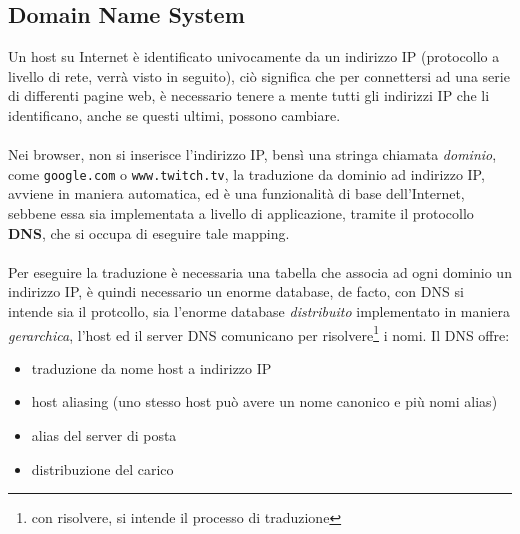 \documentclass[12pt, letterpaper]{article}
\newcommand{\code}[1]{\colorbox{light-gray}{\texttt{#1}}}
\newcommand{\acc}{\\\hphantom{}\\}
\begin{document}
\subsection{Domain Name System}
Un host su Internet è identificato univocamente da un indirizzo IP (protocollo a livello di rete, verrà
visto in seguito), ciò significa che per connettersi ad una serie di differenti pagine web, è necessario
tenere a mente tutti gli indirizzi IP che li identificano, anche se questi ultimi, possono cambiare.\acc
Nei browser, non si inserisce l'indirizzo IP, bensì una stringa chiamata \textit{dominio}, come
\code{google.com} o \code{www.twitch.tv}, la traduzione da dominio ad indirizzo IP, avviene in maniera automatica,
ed è una funzionalità di base dell'Internet, sebbene essa sia implementata a livello di applicazione, tramite il
protocollo \textbf{DNS}, che si occupa di eseguire tale mapping.\acc
Per eseguire la traduzione è necessaria una tabella che associa ad ogni dominio un indirizzo IP, è quindi
necessario un enorme database, de facto, con DNS si intende sia il protcollo, sia l'enorme
database \textit{distribuito} implementato in maniera \textit{gerarchica}, l'host ed il server DNS comunicano
per risolvere\footnote{con risolvere, si intende il processo di traduzione} i nomi. Il DNS offre:\begin{itemize}
    \item traduzione da nome host a indirizzo IP
    \item host aliasing (uno stesso host può avere un nome canonico e più nomi alias)
    \item alias del server di posta
    \item distribuzione del carico
\end{itemize}
\end{document}
